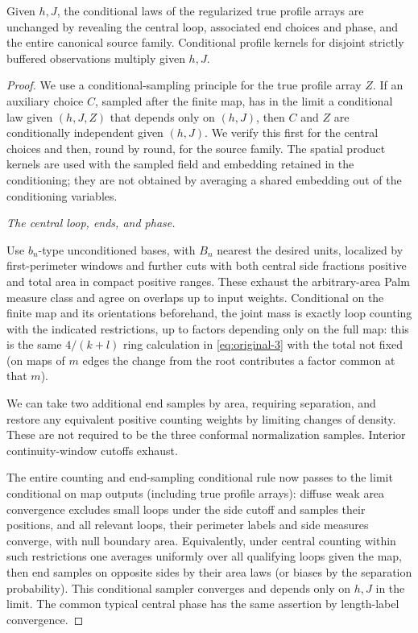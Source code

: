 \begin{proposition}\label{conf:source-elimination}
Given \(h,J\), the conditional laws of the regularized true profile arrays are unchanged by
revealing the central loop, associated end choices and phase, and the entire canonical source
family. Conditional profile kernels for disjoint strictly buffered observations multiply given
\(h,J\).
\end{proposition}
\begin{proof}
We use a conditional-sampling principle for the true profile array
\(Z\). If an auxiliary choice \(C\), sampled after the finite map,
has in the limit a conditional law given \((h,J,Z)\) that depends
only on \((h,J)\), then \(C\) and \(Z\) are conditionally
independent given \((h,J)\). We verify this first for the central
choices and then, round by round, for the source family. The spatial
product kernels are used with the sampled field and embedding retained
in the conditioning; they are not obtained by averaging a shared
embedding out of the conditioning variables.

\smallskip\noindent\emph{The central loop, ends, and phase.}\par

Use \(b_n\)-type unconditioned bases, with \(B_n\) nearest the desired units, localized by
first-perimeter windows and further cuts with both central side fractions positive and total area in
compact positive ranges. These exhaust the arbitrary-area Palm measure class and agree on overlaps
up to input weights. Conditional on the finite map and its orientations beforehand, the joint mass
is exactly loop counting with the indicated restrictions, up to factors depending only on the full
map: this is the same \(4/(k+l)\) ring calculation in \eqref{eq:original-3} with the total not fixed
(on maps of \(m\) edges the change from the root contributes a factor common at that \(m\)).

We can take two additional end samples by area, requiring separation, and restore any equivalent
positive counting weights by limiting changes of density. These are not required to be the three
conformal normalization samples. Interior continuity-window cutoffs exhaust.

The entire counting and end-sampling conditional rule now passes to the limit conditional on map
outputs (including true profile arrays): diffuse weak area convergence excludes small loops under
the side cutoff and samples their positions, and all relevant loops, their perimeter labels and side
measures converge, with null boundary area. Equivalently, under central counting within such
restrictions one averages uniformly over all qualifying loops given the map, then end samples on
opposite sides by their area laws (or biases by the separation probability). This conditional
sampler converges and depends only on \(h,J\) in the limit. The common typical central phase has the
same assertion by length-label convergence.


\end{proof}
